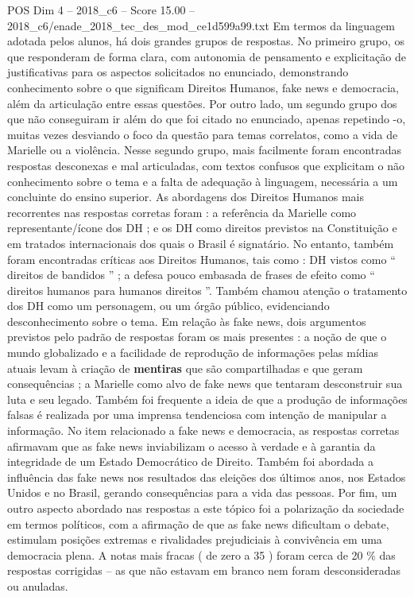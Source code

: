 \begin{textsample}{POS Dim 4 – 2018\_c6 – Score 15.00 – 2018\_c6/enade\_2018\_tec\_des\_mod\_ce1d599a99.txt}
Em termos da linguagem adotada pelos alunos, há dois grandes grupos de respostas.
No primeiro grupo, os que responderam de forma clara, com autonomia de pensamento e explicitação de justificativas para os aspectos solicitados no enunciado, demonstrando conhecimento sobre o que significam Direitos Humanos, fake news e democracia, além da articulação entre essas questões.
Por outro lado, um segundo grupo dos que não conseguiram ir além do que foi citado no enunciado, apenas repetindo -o, muitas vezes desviando o foco da questão para temas correlatos, como a vida de Marielle ou a violência.
Nesse segundo grupo, mais facilmente foram encontradas respostas desconexas e mal articuladas, com textos confusos que explicitam o não conhecimento sobre o tema e a falta de adequação à linguagem, necessária a um concluinte do ensino superior.
As abordagens dos Direitos Humanos mais recorrentes nas respostas corretas foram : a referência da Marielle como representante/ícone dos DH ; e os DH como direitos previstos na Constituição e em tratados internacionais dos quais o Brasil é signatário.
No entanto, também foram encontradas críticas aos Direitos Humanos, tais como : DH vistos como “ direitos de bandidos ” ; a defesa pouco embasada de frases de efeito como “ direitos humanos para humanos direitos ”.
Também chamou atenção o tratamento dos DH como um personagem, ou um órgão público, evidenciando desconhecimento sobre o tema.
Em relação às fake news, dois argumentos previstos pelo padrão de respostas foram os mais presentes : a noção de que o mundo globalizado e a facilidade de reprodução de informações pelas mídias atuais levam à criação de \textbf{mentiras} que são compartilhadas e que geram consequências ; a Marielle como alvo de fake news que tentaram desconstruir sua luta e seu legado.
Também foi frequente a ideia de que a produção de informações falsas é realizada por uma imprensa tendenciosa com intenção de manipular a informação.
No item relacionado a fake news e democracia, as respostas corretas afirmavam que as fake news inviabilizam o acesso à verdade e à garantia da integridade de um Estado Democrático de Direito.
Também foi abordada a influência das fake news nos resultados das eleições dos últimos anos, nos Estados Unidos e no Brasil, gerando consequências para a vida das pessoas.
Por fim, um outro aspecto abordado nas respostas a este tópico foi a polarização da sociedade em termos políticos, com a afirmação de que as fake news dificultam o debate, estimulam posições extremas e rivalidades prejudiciais à convivência em uma democracia plena.
A notas mais fracas ( de zero a 35 ) foram cerca de 20 \% das respostas corrigidas – as que não estavam em branco nem foram desconsideradas ou anuladas.

\end{textsample}
